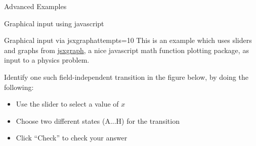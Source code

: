 \begin{edXchapter}{Advanced Examples}
\begin{edXsection}{Graphical input using javascript}
\begin{edXvertical}
\begin{edXproblem}{Graphical input via jsxgraph}{attempts=10}
This is an example which uses sliders and graphs from
\href{http://jsxgraph.uni-bayreuth.de/}{jsxgraph}, a nice javascript
math function plotting package, as input to a physics problem.

     Identify one such field-independent transition in the figure
     below, by doing the following:
     \begin{itemize}
     \item Use the slider to select a value of $x$
     \item Choose two different states (A...H) for the transition
     \item Click ``Check'' to check your answer
     \end{itemize}



%

\end{edXproblem}


\end{edXvertical}

\end{edXsection}


\end{edXchapter}
